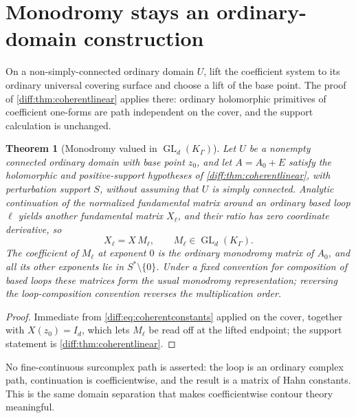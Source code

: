 \documentclass[11pt,letterpaper]{article}
\numberwithin{equation}{section}
\newtheorem{theorem}{Theorem}[section]
\theoremstyle{definition}
\theoremstyle{remark}
\newcommand{\GL}{\operatorname{GL}}
\begin{document}
\section{Monodromy stays an ordinary-domain construction}
\label{diff:sec:monodromy}

On a non-simply-connected ordinary domain $U$, lift the coefficient system to
its ordinary universal covering surface and choose a lift of the base point.
The proof of \cref{diff:thm:coherentlinear} applies there: ordinary
holomorphic primitives of coefficient one-forms are path independent on the
cover, and the support calculation is unchanged.

\begin{theorem}[Monodromy valued in $\GL_{d}(K_{\Gamma})$]
\label{diff:thm:monodromy}
Let $U$ be a nonempty connected ordinary domain with base point $z_0$, and
let $A=A_0+E$ satisfy the holomorphic and positive-support hypotheses of
\cref{diff:thm:coherentlinear}, with perturbation support $S$, without
assuming that $U$ is simply connected. Analytic continuation of the normalized
fundamental matrix around an ordinary based loop $\ell$ yields another fundamental matrix $X_{\ell}$, and their ratio
has zero coordinate derivative, so
\begin{equation}\label{diff:eq:monodromy}
 X_{\ell}=X\,M_{\ell},\qquad M_{\ell}\in\GL_{d}(K_{\Gamma}).
\end{equation}
The coefficient of $M_{\ell}$ at exponent $0$ is the ordinary monodromy matrix
of $A_{0}$, and all its other exponents lie in $S^{*}\setminus\{0\}$. Under a
fixed convention for composition of based loops these matrices form the usual
monodromy representation; reversing the loop-composition convention reverses
the multiplication order.
\end{theorem}
\begin{proof}
Immediate from \cref{diff:eq:coherentconstants} applied on the cover, together
with $X(z_{0})=I_{d}$, which lets $M_{\ell}$ be read off at the lifted
endpoint; the support statement is \cref{diff:thm:coherentlinear}.
\end{proof}

No fine-continuous surcomplex path is asserted: the loop is an ordinary
complex path, continuation is coefficientwise, and the result is a matrix of
Hahn constants. This is the same domain separation that makes coefficientwise
contour theory meaningful.
\end{document}
